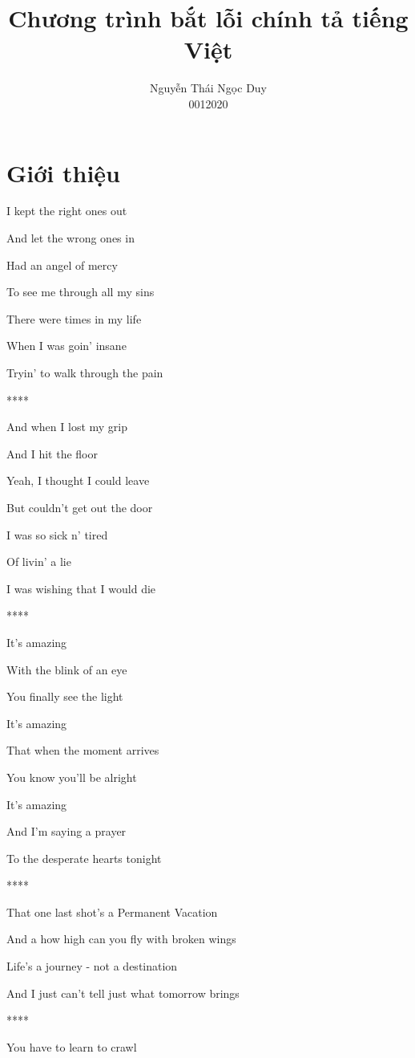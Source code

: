 \documentclass[a4paper,oneside]{book} %
\title{Chương trình bắt lỗi chính tả tiếng Việt}
\author{Nguyễn Thái Ngọc Duy\\0012020}
\theoremstyle{break}
\begin{document}
\dominitoc
\maketitle
\tableofcontents
\listoffigures
\listoftables
\large%
\chapter{Giới thiệu}
\label{cha:intro}
\begin{center}

I kept the right ones out

And let the wrong ones in

Had an angel of mercy

To see me through all my sins

There were times in my life

When I was goin' insane

Tryin' to walk through the pain

****

And when I lost my grip

And I hit the floor

Yeah, I thought I could leave

But couldn't get out the door

I was so sick n' tired

Of livin' a lie

I was wishing that I would die

****

It's amazing

With the blink of an eye

You finally see the light

It's amazing

That when the moment arrives

You know you'll be alright

It's amazing

And I'm saying a prayer

To the desperate hearts tonight


****


That one last shot's a Permanent Vacation

And a how high can you fly with broken wings

Life's a journey - not a destination

And I just can't tell just what tomorrow brings


****


You have to learn to crawl


\end{center}
\end{document}
